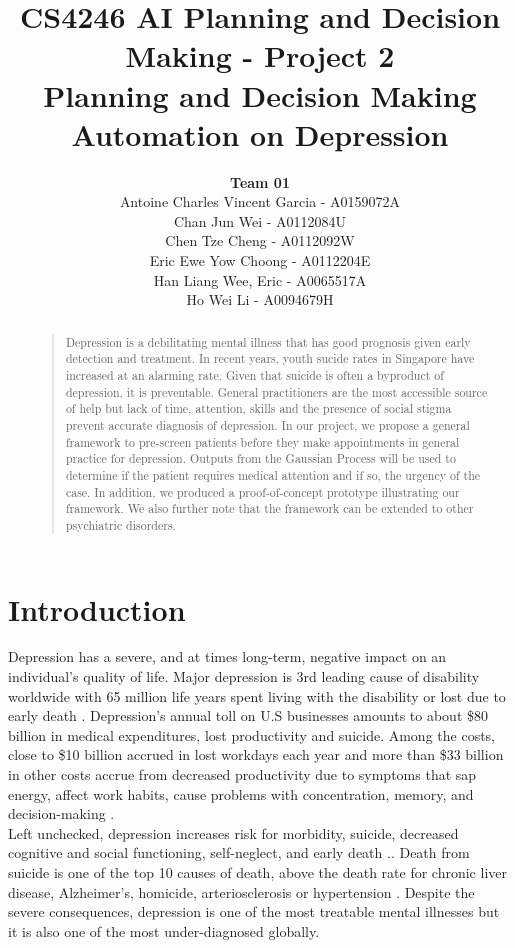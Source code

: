 \documentclass{article}
\title{
	CS4246 AI Planning and Decision Making - Project 2 \\
	Planning and Decision Making Automation on Depression
}
\author{
	{\bf Team 01} \\
	Antoine Charles Vincent Garcia - A0159072A\\
	Chan Jun Wei - A0112084U\\
	Chen Tze Cheng - A0112092W\\
	Eric Ewe Yow Choong - A0112204E\\
	Han Liang Wee, Eric - A0065517A\\
	Ho Wei Li - A0094679H\\
}
\begin{document}
 	\maketitle

	\begin{abstract}
	\begin{quote}
	Depression is a debilitating mental illness that has good prognosis given early detection and treatment. In recent years, youth sucide rates in Singapore have increased at an alarming rate. Given that suicide is often a byproduct of depression, it is preventable. General practitioners are the most accessible source of help but lack of time, attention, skills and the presence of social stigma prevent accurate diagnosis of depression. In our project, we propose a general framework to pre-screen patients before they make appointments in general practice for depression. Outputs from the Gaussian Process will be used to determine if the patient requires medical attention and if so, the urgency of the case. In addition, we produced a proof-of-concept prototype illustrating our framework. We also further note that the framework can be extended to other psychiatric disorders.\\
	\end{quote}
	\end{abstract}
	
	\section{Introduction}
	Depression has a severe, and at times long-term, negative impact on an individual's quality of life. 
	Major depression is 3rd leading cause of disability worldwide with 65 million life years spent living with the disability or lost due to early death \cite{who2004}. Depression's annual toll on U.S businesses amounts to about \$80 billion in medical expenditures, lost productivity and suicide. Among the costs, close to \$10 billion accrued in lost workdays each year and more than \$33 billion in other costs accrue from decreased productivity due to symptoms that sap energy, affect work habits, cause problems with concentration, memory, and decision-making \cite{tjcp2015}. \\

	Left unchecked, depression increases risk for morbidity, suicide, decreased cognitive and social functioning, self-neglect, and early death \cite{arcp2009}.. Death from suicide is one of the top 10 causes of death, above the death rate for chronic liver disease, Alzheimer's, homicide, arteriosclerosis or hypertension \cite{nvsr2016}. Despite the severe consequences, depression is one of the most treatable mental illnesses but it is also one of the most under-diagnosed globally. \\
\end{document}
